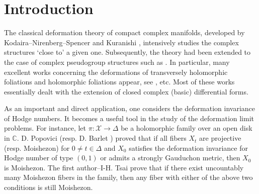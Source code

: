 \documentclass[12pt]{amsart}
\numberwithin{equation}{section}
\theoremstyle{definition}
\theoremstyle{definition}
\theoremstyle{definition}
\renewcommand{\1}{\mathsf{1}}
\renewcommand{\>}{\rightarrow}
\def\mb{\mathbb}
\theoremstyle{plain} %
\theoremstyle{plain} %
\theoremstyle{plain} %
\begin{document}
	
	
	\date{\today}
	
	
	\maketitle
	
	\setcounter{tocdepth}{1}
	\tableofcontents
	
	\section{Introduction}\label{Introduction}
	The classical deformation theory of compact complex manifolds, developed by Kodaira--Nirenberg--Spencer and Kuranishi \cite{KNS58,KS60,Ku64,Ko86}, intensively studies the complex structures `close to' a given one. Subsequently, the theory had been  extended to the case of complex pseudogroup structures such as \cite{Ko60,KS61}. In particular, many excellent works concerning the deformations  of transversely holomorphic foliations and holomorphic foliations  appear, see \cite{DK79,DK80,GM81,GHS83,EKA88,EKAN89,GN89,Gb92,EKAG97,BHTF21,Ra21}, etc.  Most of these works essentially dealt with the extension of closed complex (basic) differential forms.
	
	As an important and direct application, one considers the deformation invariance of Hodge numbers. It becomes a useful tool in the study of the deformation limit problems. For instance, let $\pi:\mathcal{X}\rightarrow \Delta$ be a holomorphic family over an open disk in $\mb C$. 
    D. Popovici \cite{Po13} (resp. D. Barlet \cite{Ba15}) proved that if all fibers $X_{t}$ are projective (resp. Moishezon) for $0\neq t\in\Delta$ and $X_{0}$ satisfies the deformation invariance for Hodge number of type $(0,1)$ or admits a strongly Gauduchon metric, then $X_{0}$ is Moishezon. The first author--I-H. Tsai \cite{RT21} prove that if there exist uncountably many Moishezon fibers in the family, then any fiber with either of the above two conditions is still Moishezon.
	
\end{document}
